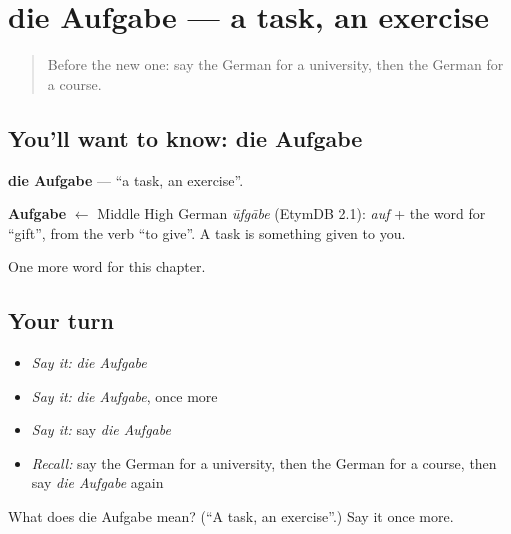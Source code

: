 \section[die Aufgabe]{die Aufgabe — a task, an exercise}

\label{lesson:GE-C160-aufgabe}



\begin{quote}
Before the new one: say the German for a university, then the German for a course.
\end{quote}

\subsection*{You'll want to know: die Aufgabe}
\textbf{die Aufgabe} — \textquotedblleft{}a task, an exercise\textquotedblright{}.

\begin{cousinweb}
\textbf{Aufgabe} $\leftarrow$ Middle High German \emph{ūfgābe} (EtymDB 2.1): \emph{auf} + the word for \textquotedblleft{}gift\textquotedblright{}, from the verb \textquotedblleft{}to give\textquotedblright{}. A task is something given to you.
\end{cousinweb}

\begin{grammarlens}[title={What you've built}]
One more word for this chapter.
\end{grammarlens}

\subsection*{Your turn}
\begin{itemize}
\raggedright
  \item \emph{Say it:} \emph{die Aufgabe}
  \item \emph{Say it:} \emph{die Aufgabe}, once more
  \item \emph{Say it:} say \emph{die Aufgabe}
  \item \emph{Recall:} say the German for a university, then the German for a course, then say \emph{die Aufgabe} again
\end{itemize}

\begin{tcolorbox}[breakable,colback=teal!4,colframe=teal!35!black,title={Before you move on}]
What does die Aufgabe mean? (\textquotedblleft{}A task, an exercise\textquotedblright{}.) Say it once more.
\end{tcolorbox}

